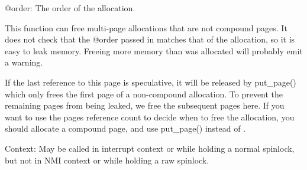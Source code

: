 @order:\+ The order of the allocation.

This function can free multi-\/page allocations that are not compound pages. It does not check that the @order passed in matches that of the allocation, so it is easy to leak memory. Freeing more memory than was allocated will probably emit a warning.

If the last reference to this page is speculative, it will be released by put\+\_\+page() which only frees the first page of a non-\/compound allocation. To prevent the remaining pages from being leaked, we free the subsequent pages here. If you want to use the page\textquotesingle{}s reference count to decide when to free the allocation, you should allocate a compound page, and use put\+\_\+page() instead of .

Context:\+ May be called in interrupt context or while holding a normal spinlock, but not in NMI context or while holding a raw spinlock. 